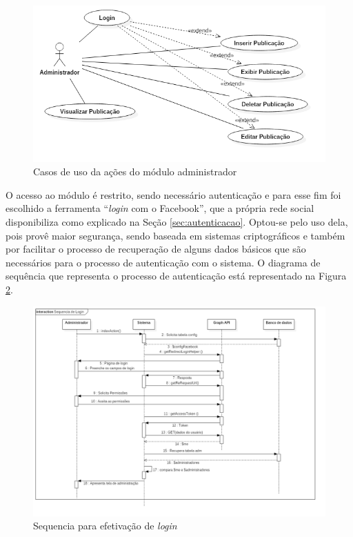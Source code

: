 \begin{figure}[H]
\centering
\includegraphics[scale=0.4]{figuras/casosDeUsoADM}
\caption{Casos de uso da ações do módulo administrador}
\label{fig:casosDeUsoADM}
\end{figure}

O acesso ao módulo é restrito, sendo necessário autenticação e para esse fim foi escolhido a ferramenta ``\textit{login} com o Facebook'', que a própria rede social disponibiliza como explicado na Seção \ref{sec:autenticacao}. Optou-se pelo uso dela, pois provê maior segurança, sendo baseada em sistemas criptográficos e também por facilitar o processo de recuperação de alguns dados básicos que são necessários para o processo de autenticação com o sistema. O diagrama de sequência que representa o processo de autenticação está representado na Figura \ref{fig:sequencialogin}.

\begin{figure}[H]
\centering
\includegraphics[scale=0.3]{figuras/sequencialogin}
\caption{Sequencia para efetivação de \textit{login}}
\label{fig:sequencialogin}
\end{figure}

